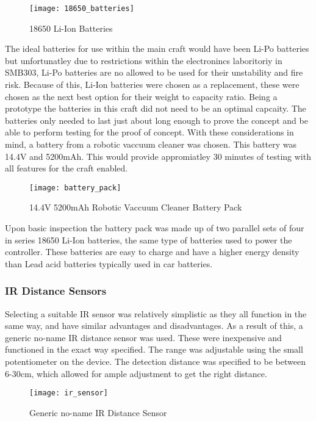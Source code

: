 \documentclass [11pt]{article}
\begin{document}
\begin{figure}[H]
\centerline{\texttt{[image: 18650\_batteries]}}
\caption{18650 Li-Ion Batteries}
\label{fig:18650_batteries}
\end{figure}

The ideal batteries for use within the main craft would have been Li-Po batteries but unfortunatley due to restrictions within the electronincs laboritoriy in SMB303, Li-Po batteries are no allowed to be used for their unstability and fire risk. Because of this, Li-Ion batteries were chosen as a replacement, these were chosen as the next best option for their weight to capacity ratio. Being a prototype the batteries in this craft did not need to be an optimal capcaity. The batteries only needed to last just about long enough to prove the concept and be able to perform testing for the proof of concept. With these considerations in mind, a battery from a robotic vaccuum cleaner was chosen. This battery was 14.4V and 5200mAh. This would provide appromiatley 30 minutes of testing with all features for the craft enabled. 

\begin{figure}[H]
\centerline{\texttt{[image: battery\_pack]}}
\caption{14.4V 5200mAh Robotic Vaccuum Cleaner Battery Pack}
\label{fig:battery_pack}
\end{figure}

Upon basic inspection the battery pack was made up of two parallel sets of four in series 18650 Li-Ion batteries, the same type of batteries used to power the controller. These batteries are easy to charge and have a higher energy density than Lead acid batteries typically used in car batteries. 

\subsubsection{IR Distance Sensors}

Selecting a suitable IR sensor was relatively simplistic as they all function in the same way, and have similar advantages and disadvantages. As a result of this, a generic no-name IR distance sensor was used. These were inexpensive and functioned in the exact way specified. The range was adjustable using the small potentiometer on the device. The detection distance was specified to be between 6-30cm, which allowed for ample adjustment to get the right distance. 

\begin{figure}[H]
\centerline{\texttt{[image: ir\_sensor]}}
\caption{Generic no-name IR Distance Sensor}
\label{fig:ir_sensor}
\end{figure}
\end{document}
